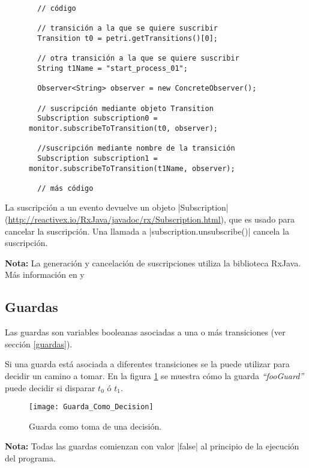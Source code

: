 \begin{figure}[H]
\centering
\begin{verbatim}
  // código
  
  // transición a la que se quiere suscribir
  Transition t0 = petri.getTransitions()[0]; 
  
  // otra transición a la que se quiere suscribir
  String t1Name = "start_process_01";
  
  Observer<String> observer = new ConcreteObserver();
  
  // suscripción mediante objeto Transition
  Subscription subscription0 = monitor.subscribeToTransition(t0, observer);
  
  //suscripción mediante nombre de la transición
  Subscription subscription1 = monitor.subscribeToTransition(t1Name, observer);
  
  // más código
\end{verbatim}
\end{figure}

La suscripción a un evento devuelve un objeto |Subscription|
(\url{http://reactivex.io/RxJava/javadoc/rx/Subscription.html}),
que es usado para cancelar la suscripción.
Una llamada a |subscription.unsubscribe()| cancela la suscripción.

\begin{framed}
\textbf{Nota:} La generación y cancelación de suscripciones utiliza la
biblioteca RxJava. Más información en \cite{RxJava} y \cite{RxJavaJavadoc}
\end{framed}

\subsection{Guardas}

Las guardas son variables booleanas asociadas a una o más transiciones (ver
sección \ref{guardas}).

Si una guarda está asociada a diferentes transiciones se la puede utilizar para
decidir un camino a tomar. En la figura \ref{fig:guarda_como_decision} se
muestra cómo la guarda \textit{``fooGuard''} puede decidir si disparar $t_{0}$ ó
$t_{1}$.

\begin{figure}[H]
  \centering
  \texttt{[image: Guarda\_Como\_Decision]}
  \caption{Guarda como toma de una decisión.}
  \label{fig:guarda_como_decision}
\end{figure}

\begin{framed}
\textbf{Nota:} Todas las guardas comienzan con valor |false| al
principio de la ejecución del programa.
\end{framed}


